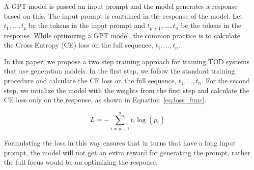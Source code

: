 A GPT model is passed an input prompt and the model generates a response based on this. The input prompt is contained
in the response of the model.
Let $t_1, ..., t_p$ be the tokens in the input prompt and $t_{p+1}, ..., t_{n}$ be the tokens in the response.
While optimizing a GPT model, the common practice is to calculate the Cross Entropy (CE) loss on the full sequence, $t_1, ..., t_n$.

In this paper, we propose a two step training approach for training TOD systems that use generation models.
In the first step, we follow the standard training procedure and calculate the CE loss on the full sequence, $t_1, ..., t_n$.
For the second step, we intialize the model with the weights from the first step and calculate the CE loss only on the response,
as shown in Equation~\eqref{eq:loss_func}.

\begin{equation}
    L = - \sum_{i=p+1}^{n} t_i \log(p_i)
    \label{eq:loss_func}
\end{equation}

Formulating the loss in this way ensures that in turns that have a long input prompt, the model will not get an extra
reward for generating the prompt, rather the full focus would be on optimizing the response.